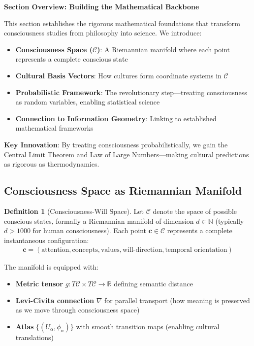 \documentclass[11pt,a4paper]{article}
\theoremstyle{definition}
\newtheorem{definition}{Definition}[section]
\theoremstyle{remark}
\newcommand{\RR}{\mathbb{R}}
\newcommand{\CC}{\mathcal{C}}
\newcommand{\cc}{\mathbf{c}}
\begin{document}
\begin{small}
\begin{mdframed}[backgroundcolor=cyan!5,linewidth=2pt]
\textbf{Section Overview: Building the Mathematical Backbone}

This section establishes the rigorous mathematical foundations that transform consciousness studies from philosophy into science. We introduce:

\begin{itemize}[nosep]
    \item \textbf{Consciousness Space (\(\CC\))}: A Riemannian manifold where each point represents a complete conscious state
    \item \textbf{Cultural Basis Vectors}: How cultures form coordinate systems in \(\CC\)
    \item \textbf{Probabilistic Framework}: The revolutionary step—treating consciousness as random variables, enabling statistical science
    \item \textbf{Connection to Information Geometry}: Linking to established mathematical frameworks
\end{itemize}

\textbf{Key Innovation}: By treating consciousness probabilistically, we gain the Central Limit Theorem and Law of Large Numbers—making cultural predictions as rigorous as thermodynamics.
\end{mdframed}

\subsection{Consciousness Space as Riemannian Manifold}

\begin{definition}[Consciousness-Will Space]
Let \(\CC\) denote the space of possible conscious states, formally a Riemannian manifold of dimension \(d \in \mathbb{N}\) (typically \(d > 1000\) for human consciousness). Each point \(\cc \in \CC\) represents a complete instantaneous configuration:
\begin{align}
\cc = (\text{attention}, \text{concepts}, \text{values}, \text{will-direction}, \text{temporal orientation})
\end{align}

The manifold is equipped with:
\begin{itemize}
\item \textbf{Metric tensor} \(g: T\CC \times T\CC \rightarrow \RR\) defining semantic distance
\item \textbf{Levi-Civita connection} \(\nabla\) for parallel transport (how meaning is preserved as we move through consciousness space)
\item \textbf{Atlas} \(\{(U_\alpha, \phi_\alpha)\}\) with smooth transition maps (enabling cultural translations)
\end{itemize}
\end{definition}


\end{small}
\end{document}

